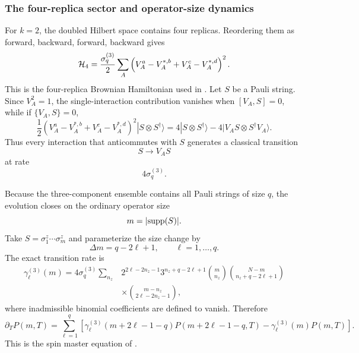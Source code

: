 \documentclass{article}
\theoremstyle{definition}
\begin{document}
\subsubsection{The four-replica sector and operator-size dynamics}

For $k=2$, the doubled Hilbert space contains four replicas.  Reordering
them as forward, backward, forward, backward gives
\begin{equation}
    {\cal H}_4
    =\frac{\sigma_q^{(3)}}{2}
    \sum_A
    \left(
       V_A^a-V_A^{*,b}+V_A^c-V_A^{*,d}
    \right)^2.
\end{equation}
This is the four-replica Brownian Hamiltonian used in
\cite{XuBrownianSpin}.  Let $S$ be a Pauli string.  Since $V_A^2=1$, the
single-interaction contribution vanishes when $[V_A,S]=0$, while if
$\{V_A,S\}=0$,
\begin{equation}
    \frac12
    \left(
       V_A^a-V_A^{*,b}+V_A^c-V_A^{*,d}
    \right)^2
    |S\otimes S^\dagger\rangle
    =4|S\otimes S^\dagger\rangle
     -4|V_AS\otimes S^\dagger V_A\rangle.
\end{equation}
Thus every interaction that anticommutes with $S$ generates a classical
transition
\begin{equation}
    S\longrightarrow V_AS
\end{equation}
at rate
\begin{equation}
    4\sigma_q^{(3)}.
\end{equation}

Because the three-component ensemble contains all Pauli strings of size
$q$, the evolution closes on the ordinary operator size
\begin{equation}
    m=|{\rm supp}(S)|.
\end{equation}
Take $S=\sigma_1^z\cdots\sigma_m^z$ and parameterize the size change by
\begin{equation}
    \Delta m=q-2\ell+1,
    \qquad \ell=1,\ldots,q.
\end{equation}
The exact transition rate is
\begin{align}
    \gamma_\ell^{(3)}(m)
    =4\sigma_q^{(3)}\sum_{n_z}
    &2^{2\ell-2n_z-1}
     3^{n_z+q-2\ell+1}
     \binom{m}{n_z}
     \binom{N-m}{n_z+q-2\ell+1}
    \nonumber\\
    &\times
     \binom{m-n_z}{2\ell-2n_z-1},
\end{align}
where inadmissible binomial coefficients are defined to vanish.  Therefore
\begin{equation}
    \partial_TP(m,T)
    =\sum_{\ell=1}^q
    \left[
       \gamma_\ell^{(3)}(m+2\ell-1-q)
       P(m+2\ell-1-q,T)
       -\gamma_\ell^{(3)}(m)P(m,T)
    \right].
\end{equation}
This is the spin master equation of \cite{XuBrownianSpin}.
\end{document}
